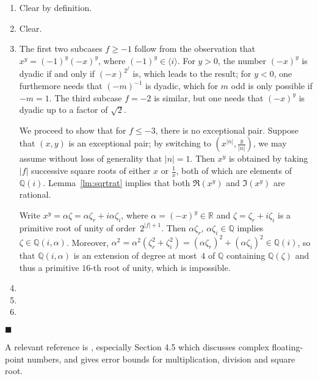 \documentclass {article}
\newcommand {\Q}{\mathbb Q}
\newcommand {\R}{\mathbb R}
\renewcommand {\leq}{\leqslant}
\renewcommand {\geq}{\geqslant}
\newenvironment{proof}{\noindent{\bf Proof:}}{{\hspace* {\fill}$\blacksquare$}}
\begin{document}
\begin {proof}
\begin {enumerate}
\item
Clear by definition.
\item
Clear.
\item
The first two subcases $f \geq -1$ follow from the observation that
$x^y = (-1)^y (-x)^y$, where $(-1)^y \in \langle i \rangle$.
For $y > 0$, the number $(-x)^y$ is dyadic if and only if $(-x)^{2^f}$ is,
which leads to the result; for $y < 0$, one furthemore needs that
$(-m)^{-1}$ is dyadic, which for $m$ odd is only possible if $-m = 1$.
The third subcase $f = -2$ is similar, but one needs that $(-x)^y$ is dyadic
up to a factor of $\sqrt 2$.

We proceed to show that for $f \leq -3$, there is no exceptional pair.
Suppose that $(x, y)$ is an exceptional pair; by switching to
$\left( x^{|n|}, \frac {y}{|n|} \right)$, we may assume
without loss of generality that $|n| = 1$. Then $x^y$ is obtained by
taking $|f|$ successive square roots of either $x$ or $\frac {1}{x}$, both
of which are elements of $\Q (i)$. Lemma~\ref {lm:sqrtrat} implies
that both $\Re (x^y)$ and $\Im (x^y)$ are rational.

Write $x^y = \alpha \zeta = \alpha \zeta_r + i \alpha \zeta_i$, where
$\alpha = (-x)^y \in \R$ and $\zeta = \zeta_r + i \zeta_i$ is a primitive root
of unity of order~$2^{|f| + 1}$.
Then $\alpha \zeta_r$, $\alpha \zeta_i \in \Q$ implies $\zeta \in \Q (i, \alpha)$.
Moreover,
$\alpha^2 = \alpha^2 (\zeta_r^2 + \zeta_i^2) =
(\alpha \zeta_r)^2 + (\alpha \zeta_i)^2 \in \Q (i)$, so that $\Q (i, \alpha)$
is an extension of degree at most~$4$ of $\Q$ containing $\Q (\zeta)$
and thus a primitive $16$-th root of unity, which is impossible.
\item
\item
\item
\end {enumerate}
\end {proof}

A relevant reference is \cite{BrDiJeLeMeMuReStTo09}, especially Section 4.5
which discusses complex floating-point numbers, and gives error bounds for
multiplication, division and square root.



\end{document}
